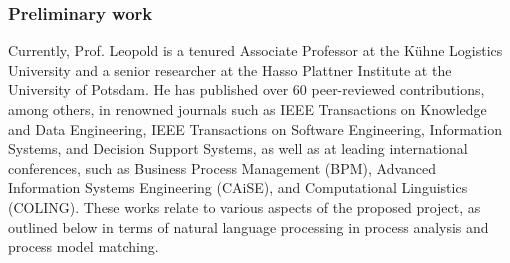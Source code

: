 \subsubsection{Preliminary work}


Currently, Prof. Leopold is a tenured Associate Professor at the Kühne Logistics University and a senior researcher at the Hasso Plattner Institute at the University of Potsdam. He has published over 60 peer-reviewed contributions, among others, in renowned journals such as IEEE Transactions on Knowledge and Data Engineering, IEEE Transactions on Software Engineering, Information Systems, and Decision Support Systems, as well as at leading international conferences, such as Business Process Management (BPM), Advanced Information Systems Engineering (CAiSE), and Computational Linguistics (COLING). These works relate to various aspects of the proposed project, as outlined below in terms of natural language processing in process analysis and process model matching.



